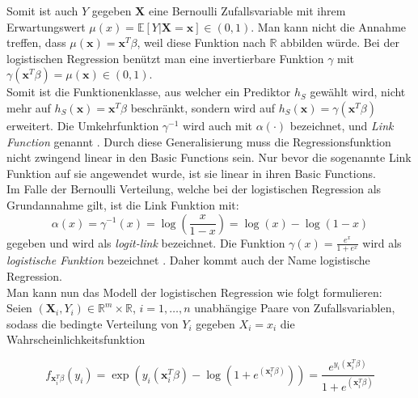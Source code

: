 Somit ist auch $Y$ gegeben $\mathbf{X}$ eine Bernoulli Zufallsvariable mit ihrem Erwartungswert $\mu(x) = \mathbb{E}[Y|\mathbf{X} = \mathbf{x}] \in (0,1)$. Man kann nicht die Annahme treffen, dass 
$\mu(\mathbf{x}) = \mathbf{x}^T\beta$, weil diese Funktion nach $\mathbb{R}$ abbilden w\"urde. Bei der logistischen Regression ben\"utzt man eine invertierbare Funktion $\gamma$ mit 
$\gamma(\mathbf{x}^T\beta) = \mu(\mathbf{x}) \in (0,1)$. \\

Somit ist die Funktionenklasse, aus welcher ein Prediktor $h_S$ gew\"ahlt wird, nicht mehr auf $h_S(\mathbf{x}) = \mathbf{x}^T\beta$ beschr\"ankt, 
sondern wird auf  $h_S(\mathbf{x}) = \gamma(\mathbf{x}^T\beta)$ erweitert. Die Umkehrfunktion $\gamma^{-1}$ wird auch mit $\alpha(\cdot)$ bezeichnet, 
und \textit{Link Function} genannt \cite{wasserman}. Durch diese Generalisierung muss die Regressionsfunktion nicht zwingend linear in den Basic Functions sein. 
Nur bevor die sogenannte Link Funktion auf sie angewendet wurde, ist sie linear in ihren Basic Functions. \\ 

Im Falle der Bernoulli Verteilung, welche bei der logistischen Regression als Grundannahme gilt, ist die Link Funktion mit:
$$ \alpha(x) = \gamma^{-1}(x) = \log(\frac{x}{1-x}) = \log(x) - \log(1-x) $$
gegeben und wird als \textit{logit-link} bezeichnet. Die Funktion $\gamma(x) = \frac{e^x}{1 + e^x}$ wird als \textit{logistische Funktion} bezeichnet \cite{wasserman}. 
Daher kommt auch der Name \glqq logistische Regression\grqq{}. \\


Man kann nun das Modell der logistischen Regression wie folgt formulieren: \\
Seien $(\mathbf{X}_i, Y_i) \in \mathbb{R}^m \times \mathbb{R}$, $i = 1, \dots , n$  unabh\"angige Paare von Zufallsvariablen, sodass die bedingte Verteilung von 
$Y_i$ gegeben $X_i = x_i$ die Wahrscheinlichkeitsfunktion 

$$ f_{\mathbf{x}_i^T\beta}(y_i) = \exp( y_i(\mathbf{x}_i^T\beta) - \log(1 + e^{(\mathbf{x}_i^T\beta)})) = \frac{e^{y_i(\mathbf{x}_i^T\beta)}}{1 + e^{(\mathbf{x}_i^T\beta)}}$$

